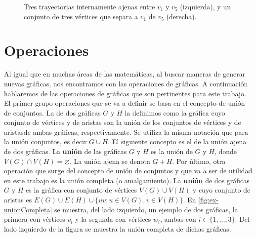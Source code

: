 \begin{figure}[htb!]
    \caption{Tres trayectorias internamente ajenas entre $v_1$ y $v_5$ (izquierda), y un conjunto de tres v\'ertices que separa a $v_1$ de $v_5$ (derecha).}
    \label{fig:ex-menger}
\end{figure}

\begin{teorema}

\end{teorema}

\section{Operaciones}
\label{sec:operaciones}

Al igual que en muchas \'areas de las matem\'aticas, al buscar maneras de
generar nuevas gr\'aficas, nos encontramos con las operaciones de gr\'aficas. A
continuaci\'on hablaremos de las operaciones de gr\'aficas que son pertinentes
para este trabajo. El primer grupo operaciones que se va a definir se basa en el
concepto de uni\'on de conjuntos. La  de dos gr\'aficas $G$ y
$H$ la definimos como la gr\'afica cuyo conjunto de v\'ertices y de aristas son
la uni\'on de los conjuntos de v\'ertices  y de aristasde ambas gr\'aficas,
respectivamente. Se utiliza la misma notaci\'on que para la uni\'on conjuntos,
es decir $G \cup H$. El siguiente concepto es el de la uni\'on ajena de dos
gr\'aficas. La \textbf{uni\'on}  de las gr\'aficas $G$
y $H$ es la uni\'on de $G$ y $H$, donde $V(G) \cap V(H) = \varnothing$. La
uni\'on ajena se denota $G + H$. Por \'ultimo, otra operaci\'on que surge del
concepto de uni\'on de conjuntos y que va a ser de utilidad en este trabajo es
la uni\'on completa (o amalgamiento). La \textbf{uni\'on}
 de dos gr\'aficas $G$ y $H$ es la gr\'afica con
conjunto de v\'ertices $V(G) \cup V(H)$ y cuyo conjunto de aristas es $E(G) \cup
E(H) \cup \{uv \colon u \in V(G), v \in V(H) \}$. En \cref{fig:ex-unionCompleta}
se muestra, del lado izquierdo, un ejemplo de dos gr\'aficas, la primera con
v\'ertices $v_i$ y la segunda con v\'ertices $w_i$, ambas con $i \in
\{1,...,3\}$. Del lado izquierdo de la figura se muestra la uni\'on completa de
dichas gr\'aficas.

